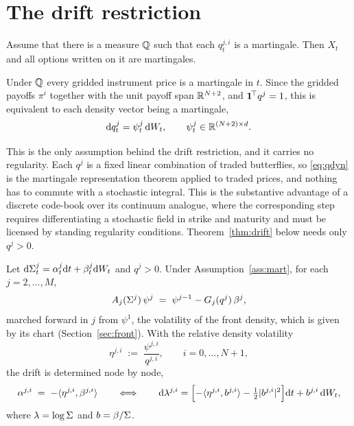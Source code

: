 \section{The drift restriction}\label{sec:drift}

\begin{theorem}\label{ass:mart}
Assume that there is a measure $\mathbb Q$ such that each $q_t^{j,i}$ is a martingale.
Then $X_t$ and all options written on it are martingales.
\end{theorem}




Under $\mathbb Q$ every gridded instrument price is a martingale in $t$. Since the
gridded payoffs $\pi^i$ together with the unit payoff span $\mathbb R^{N+2}$, and
$\mathbf 1^{\!\top}q^j=1$, this is equivalent to each density
vector being a martingale,
\begin{equation}\label{eq:qdyn}
  \mathrm d q^j_t=\psi^j_t\,\mathrm d W_t,\qquad \psi^j_t\in\mathbb R^{(N+2)\times d}.
\end{equation}

This is the only assumption behind the drift restriction, and it carries no
regularity. Each
$q^j$ is a fixed linear combination of traded butterflies, so \eqref{eq:qdyn} is
the martingale representation theorem applied to traded prices, and nothing has
to commute with a stochastic integral. This is the substantive advantage of a
discrete code-book over its continuum analogue, where the corresponding step
requires differentiating a stochastic field in strike and maturity and must be
licensed by standing regularity conditions. Theorem~\ref{thm:drift} below
needs only $q^j>0$.

\begin{theorem}\label{thm:drift}
Let $\mathrm d\Sigma^j_t=\alpha^j_t\mathrm d t+\beta^j_t\mathrm d W_t$ and $q^j>0$. Under
Assumption~\ref{ass:mart}, for each $j=2,\dots,M$,
\begin{equation}\label{eq:volsolve}
  A_j(\Sigma^j)\,\psi^j\;=\;\psi^{j-1}-G_j(q^j)\,\beta^j,
\end{equation}
marched forward in $j$ from $\psi^1$, the volatility of the front density, which
is given by its chart (Section~\ref{sec:front}). With the relative density volatility
\begin{equation}\label{eq:eta}
  \eta^{j,i}\;:=\;\frac{\psi^{j,i}}{q^{j,i}},
  \qquad i=0,\dots,N+1,
\end{equation}
the drift is determined node by node,
\begin{equation}\label{eq:pointwise}
  \alpha^{j,i}\;=\;-\langle \eta^{j,i},\beta^{j,i}\rangle
  \qquad\Longleftrightarrow\qquad
  \mathrm d\lambda^{j,i}=\Bigl[-\langle \eta^{j,i},b^{j,i}\rangle-\tfrac12\lvert b^{j,i}\rvert^{2}\Bigr]\mathrm d t
   +b^{j,i}\,\mathrm d W_t,
\end{equation}
where $\lambda=\log\Sigma$ and $b=\beta/\Sigma$.
\end{theorem}

